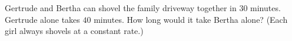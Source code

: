 Gertrude and Bertha can shovel the family driveway together in $30$ minutes. Gertrude alone takes $40$ minutes. How long would it take Bertha alone? (Each girl always shovels at a constant rate.)

